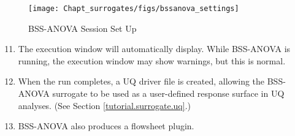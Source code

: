 \begin{figure}[H]
	\begin{center}
		\texttt{[image: Chapt\_surrogates/figs/bssanova\_settings]}
		\caption{BSS-ANOVA Session Set Up}
		\label{fig.bssanova.settings}
	\end{center}
\end{figure}

\begin{enumerate}
   \setcounter{enumi}{10}
   \item The execution window will automatically display. While BSS-ANOVA is
     running, the execution window may show warnings, but this is normal.
   \item When the run completes, a UQ driver file is created, allowing the
     BSS-ANOVA surrogate to be used as a user-defined response surface in UQ
     analyses. (See Section \ref{tutorial.surrogate.uq}.)
   \item BSS-ANOVA also produces a flowsheet plugin.
\end{enumerate}

